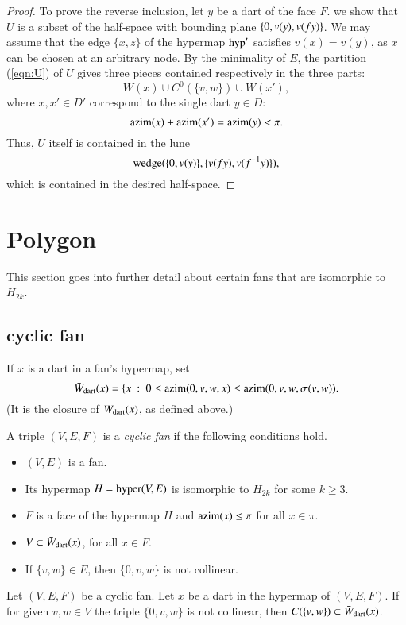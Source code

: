 {{\begin{proof}
To prove the reverse inclusion, let $y$  be a dart of
the face $F$.  we show that $U$ is a subset of the half-space with bounding
plane $\{0,v(y),v(f y)\}$.  We may assume that the edge $\{x,z\}$ of the
hypermap ${\operatorname{hyp}}'$ satisfies $v(x) = v(y)$, as $x$ can be chosen at an
arbitrary node.  By the minimality of $E$,  
the partition (\ref{eqn:U}) of $U$ gives three pieces
contained respectively in the three parts:
$$
W(x) \cup C^0(\{v,w\}) \cup W(x'),
$$
where $x,x'\in D'$ correspond to the single dart $y\in D$:
$$
{\operatorname{azim}}(x) + {\operatorname{azim}}(x') = {\operatorname{azim}}(y) < \pi.
$$
Thus, $U$ itself is contained in the lune
$$
{\operatorname{wedge}}(\{0,v(y)\},\{v(f y),v(f^{-1} y)\}),
$$
which is contained in the desired half-space.
\end{proof}

\section{Polygon}

This section goes into further detail about certain fans that are isomorphic to $H_{2k}$.

\subsection{cyclic fan}

If $x$ is a dart in a fan's hypermap, set
$$
\bar W_{\text{dart}}(x) = \{ x\ :\  0\le {\operatorname{azim}}(0,v,w,x)\le {\operatorname{azim}}(0,v,w,\sigma(v,w)).
$$
(It is the closure of $W_{\text{dart}}(x)$, as defined above.)

\begin{definition}  A triple $(V,E,F)$ is a {\it cyclic fan} if the following conditions hold.
\begin{itemize} 
\item $(V,E)$ is a fan.
\item Its hypermap $H={\operatorname{hyper}}(V,E)$ is isomorphic to $H_{2k}$ for some $k\ge 3$.
\item $F$ is a face of the hypermap $H$ and ${\operatorname{azim}}(x)\le \pi$ for all $x\in \pi$.
\item $V\subset \bar W_{\text{dart}}(x)$, for all $x\in F$.
\item If $\{v,w\}\in E$, then $\{0,v,w\}$ is not collinear.
\end{itemize}
\end{definition}

\begin{lemma}  Let $(V,E,F)$ be a cyclic fan.  Let $x$ be a dart in the hypermap of $(V,E,F)$.  If for given $v,w\in V$  the triple $\{0,v,w\}$ is not collinear, then $C(\{v,w\}) \subset \bar W_{\text{dart}}(x)$.
\end{lemma}

}}
